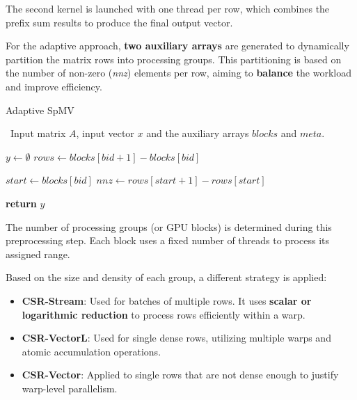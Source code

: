 \documentclass[conference]{IEEEtran}
\begin{document}
    The second kernel is launched with one thread per row, which combines the
    prefix sum results to produce the final output vector.

    For the adaptive approach, \textbf{two auxiliary arrays} are generated to
    dynamically partition the matrix rows into processing groups.
    This partitioning is based on the number of non-zero (\textit{nnz})
    elements per row, aiming to \textbf{balance} the workload and improve
    efficiency.

    \begin{algorithm}[h!]
        \caption{Adaptive SpMV}
        \algorithmicrequire~Input matrix $A$, input vector $x$ and the auxiliary arrays $blocks$ and $meta$.
        \begin{algorithmic}[2]
                \State $y \gets \emptyset$
                \State $rows \gets blocks[bid + 1] - blocks[bid]$

                    \State $start \gets blocks[bid]$
                    \State $nnz \gets rows[start + 1] - rows[start]$

                    \Else
                    \EndIf
                \EndIf

                \State \textbf{return} $y$
            \EndProcedure
        \end{algorithmic}
        \label{alg:SpMVrow}
    \end{algorithm}
 
    The number of processing groups (or GPU blocks) is determined during this
    preprocessing step.
    Each block uses a fixed number of threads to process its assigned range.

    Based on the size and density of each group, a different strategy is applied:
    \begin{itemize}
        \item \textbf{CSR-Stream}: Used for batches of multiple rows.
            It uses \textbf{scalar or logarithmic reduction} to process rows
            efficiently within a warp.
        \item \textbf{CSR-VectorL}: Used for single dense rows, utilizing
            multiple warps and atomic accumulation operations.
        \item \textbf{CSR-Vector}: Applied to single rows that are not dense
            enough to justify warp-level parallelism.
    \end{itemize}
\end{document}
